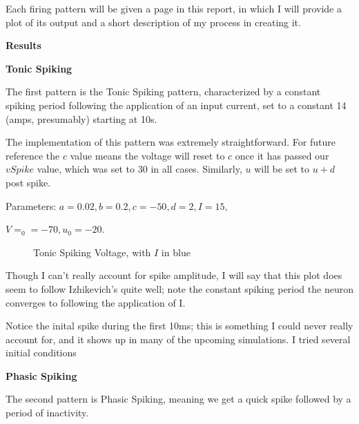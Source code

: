 \documentclass[a4paper,12pt]{article}
\begin{document}
Each firing pattern will be given a page in this report, in which I will provide a plot of its output and a short description of my process in creating it. 

\vfil\eject

{\bf Results}

\vspace{2mm}

{\bf Tonic Spiking}
\bigskip

The first pattern is the Tonic Spiking pattern, characterized by a constant spiking period following the application of an input current, set to a constant 14 (amps, presumably) starting at 10s. 

\vspace{2mm}

The implementation of this pattern was extremely straightforward. For future reference the $c$ value means the voltage will reset to $c$ once it has passed our $vSpike$ value, which was set to 30 in all cases. Similarly, $u$ will be set to $u+d$ post spike.

\vspace{2mm}

Parameters: $a=0.02, b=0.2, c=-50, d=2, I=15, $

\vspace{1mm}

$V=_{0}=-70, u_{0}=-20$. 

\begin{figure}[h!]
\begin{center}
\end{center}
\caption{\label{pict1}Tonic Spiking Voltage, with $I$ in blue}
\end{figure}

Though I can't really account for spike amplitude, I will say that this plot does seem to follow Izhikevich's quite well; note the constant spiking period the neuron converges to following the application of I. 

\vspace{2mm}

Notice the inital spike during the first 10ms; this is something I could never really account for, and it shows up in many of the upcoming simulations. I tried several initial conditions

\vfil\eject

{\bf Phasic Spiking}
\bigskip

The second pattern is Phasic Spiking, meaning we get a quick spike followed by a period of inactivity. 
\end{document}
